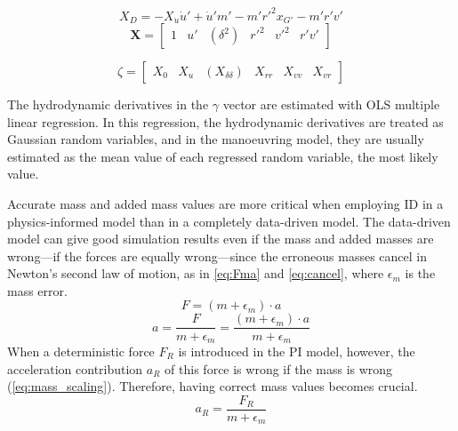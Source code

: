 \begin{equation}\label{eq:label}
X_D = - X_{\dot{u}} \dot{u}' + \dot{u}' m' - m' r'^{2} x_{G'} - m' r' v'
\end{equation}
\begin{equation}\label{eq:features}
\mathbf{X} = \begin{bmatrix} 1 & u' & (\delta^{2}) & r'^{2} & v'^{2} & r' v' \end{bmatrix}
\end{equation}

\begin{equation}\label{eq:gamma}
\zeta = \begin{bmatrix} X_{0} & X_{u} & (X_{\delta\delta}) & X_{rr} & X_{vv} & X_{vr} \end{bmatrix}
\end{equation}

The hydrodynamic derivatives in the \(\gamma\) vector are estimated with OLS multiple linear regression.
In this regression, the hydrodynamic derivatives are treated as Gaussian random variables, and in the manoeuvring model, they are usually estimated as the mean value of each regressed random variable, the most likely value.

Accurate mass and added mass values are more critical when employing ID in a physics-informed model than in a completely data-driven model.
The data-driven model can give good simulation results even if the mass and added masses are wrong---if the forces are equally wrong---since the erroneous masses cancel in Newton's second law of motion, as in \autoref{eq:Fma} and \autoref{eq:cancel}, where $\epsilon_m$ is the mass error.
\begin{equation}
    \label{eq:Fma}
    F = (m+\epsilon_m) \cdot a
\end{equation}
\begin{equation}
    \label{eq:cancel}
    a = \frac{F}{m+\epsilon_m} = \frac{(m+\epsilon_m) \cdot a}{m+\epsilon_m}
\end{equation}
When a deterministic force $F_R$ is introduced in the PI model, however, the acceleration contribution $a_R$ of this force is wrong if the mass is wrong (\autoref{eq:mass_scaling}). Therefore, having correct mass values becomes crucial.
\begin{equation}
    \label{eq:mass_scaling}
    a_R = \frac{F_R}{m+\epsilon_m}
\end{equation}